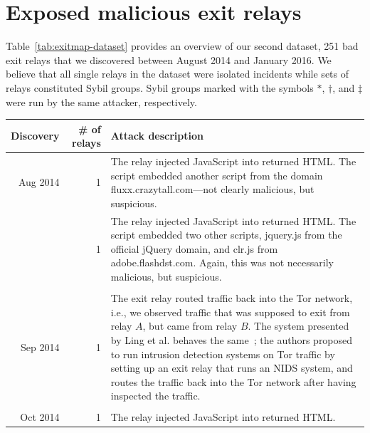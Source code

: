 \appendix

\section{Exposed malicious exit relays}
\label{sec:malicious-relays}
Table~\ref{tab:exitmap-dataset} provides an overview of our second dataset, 251
bad exit relays that we discovered between August 2014 and January 2016.  We
believe that all single relays in the dataset were isolated incidents while sets
of relays constituted Sybil groups.  Sybil groups marked with the symbols
$*$, $\dagger$, and $\ddagger$ were run by the same attacker, respectively.

\begin{table}
\small
\centering
\begin{tabularx}{\textwidth}{r r X}
\toprule
\textbf{Discovery} & \textbf{\# of relays} & \textbf{Attack description} \\
\midrule
Aug 2014 & 1 & The relay injected JavaScript into returned HTML.  The script
embedded another script from the domain fluxx.crazytall.com---not clearly
malicious, but suspicious. \\

& 1 & The relay injected JavaScript into returned HTML.  The script
embedded two other scripts, jquery.js from the official jQuery domain, and
clr.js from adobe.flashdst.com.  Again, this was not necessarily malicious, but
suspicious. \\

& & \\

Sep 2014 & 1 & The exit relay routed traffic back into the Tor network, i.e., we
observed traffic that was supposed to exit from relay $A$, but came from relay
$B$.  The system presented by Ling et al. behaves the same~\cite{Ling2015a};
the authors proposed to run intrusion detection systems on Tor traffic by
setting up an exit relay that runs an NIDS system, and routes the traffic back
into the Tor network after having inspected the traffic. \\

& & \\

Oct 2014 & 1 & The relay injected JavaScript into returned HTML. \\


\end{tabularx}
\end{table}
